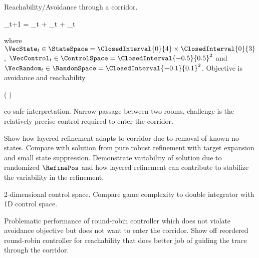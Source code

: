 Reachability/Avoidance through a corridor.

\startformula
    \VecX_{t+1} =  \VecState_{t} +  \VecControl_{t} + \VecRandom_{t} \EndComma
\stopformula

where $\VecState_{t} \in \StateSpace = \ClosedInterval{0}{4} \times \ClosedInterval{0}{3}$, $\VecControl_{t} \in \ControlSpace = \ClosedInterval{-0.5}{0.5}^2$ and $\VecRandom_{t} \in \RandomSpace = \ClosedInterval{-0.1}{0.1}^2$.
Objective is avoidance and reachability

\startformula
    ( \neg \pi ) \Until \varphi
\stopformula

co-safe interpretation.
Narrow passage between two rooms, challenge is the relatively precise control required to enter the corridor.

Show how layered refinement adapts to corridor due to removal of known no-states.
Compare with solution from pure robust refinement with target expansion and small state suppression.
Demonstrate variability of solution due to randomized $\RefinePos$ and how layered refinement can contribute to stabilize the variability in the refinement.

2-dimensional control space.
Compare game complexity to double integrator with 1D control space.

Problematic performance of round-robin controller which does not violate avoidance objective but does not want to enter the corridor.
Show off reordered round-robin controller for reachability that does better job of guiding the trace through the corridor.

